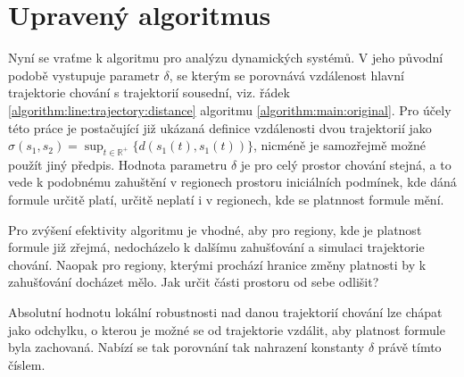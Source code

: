 \section{Upravený algoritmus}\label{section:algorithm:updated}

Nyní se vraťme k algoritmu pro analýzu dynamických systémů. V jeho původní podobě
vystupuje parametr $\delta$, se kterým se porovnává vzdálenost hlavní trajektorie chování
s trajektorií sousední, viz. řádek \ref{algorithm:line:trajectory:distance}
algoritmu \ref{algorithm:main:original}. Pro účely této práce je postačující již ukázaná
definice vzdálenosti dvou trajektorií jako $\sigma(s_1, s_2) = {\displaystyle \sup_{t \in \mathbb{R}^{+}}} \{d(s_1(t), s_1(t))\}$,
nicméně je samozřejmě možné použít jiný předpis. Hodnota parametru $\delta$ je pro celý prostor
chování stejná, a to vede k podobnému zahuštění v regionech prostoru iniciálních podmínek,
kde dáná formule určitě platí, určitě neplatí i v regionech, kde se platnnost formule mění.

Pro zvýšení efektivity algoritmu je vhodné, aby pro regiony, kde je platnost formule již zřejmá,
nedocházelo k dalšímu zahušťování a simulaci trajektorie chování. Naopak pro regiony, kterými prochází
hranice změny platnosti by k zahušťování docházet mělo. Jak určit části prostoru od sebe odlišit?

Absolutní hodnotu lokální robustnosti nad danou trajektorií chování lze chápat
jako odchylku, o kterou je možné se od trajektorie vzdálit, aby platnost
formule byla zachovaná. Nabízí se tak porovnání tak nahrazení konstanty $\delta$ 
právě tímto číslem.

